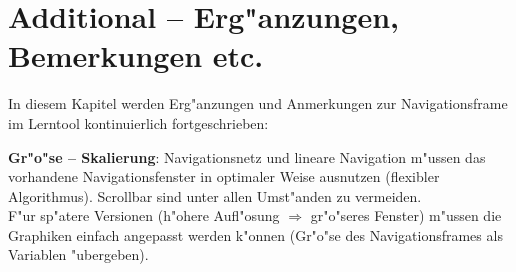 
\section{Additional -- Erg"anzungen, Bemerkungen etc.}\label{additional}

In diesem Kapitel werden Erg"anzungen und Anmerkungen zur
Navigationsframe im Lerntool kontinuierlich fortgeschrieben:

\begin{list_sabina}
        \item \textbf{Gr"o"se -- Skalierung}: 
	Navigationsnetz und lineare Navigation m"ussen das vorhandene
	Navigationsfenster in optimaler Weise ausnutzen (flexibler
	Algorithmus).
	Scrollbar sind unter allen Umst"anden zu vermeiden.\\
	F"ur sp"atere Versionen (h"ohere Aufl"osung $\Rightarrow$
	gr"o"seres Fenster) m"ussen die Graphiken einfach angepasst
	werden k"onnen
	(Gr"o"se des Navigationsframes als Variablen "ubergeben).
\end{list_sabina}

